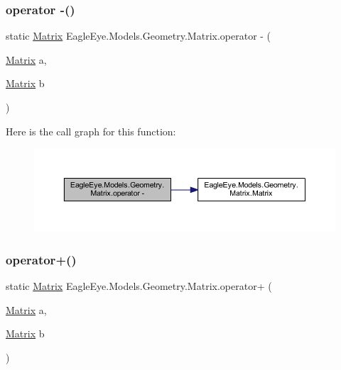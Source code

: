 \subsubsection{\texorpdfstring{operator -\/()}{operator -()}}
{\footnotesize\ttfamily static \mbox{\hyperlink{class_eagle_eye_1_1_models_1_1_geometry_1_1_matrix}{Matrix}} Eagle\+Eye.\+Models.\+Geometry.\+Matrix.\+operator -\/ (\begin{DoxyParamCaption}\item[{\mbox{\hyperlink{class_eagle_eye_1_1_models_1_1_geometry_1_1_matrix}{Matrix}}}]{a,  }\item[{\mbox{\hyperlink{class_eagle_eye_1_1_models_1_1_geometry_1_1_matrix}{Matrix}}}]{b }\end{DoxyParamCaption})\hspace{0.3cm}{\ttfamily [static]}}

Here is the call graph for this function\+:\nopagebreak
\begin{figure}[H]
\begin{center}
\leavevmode
\includegraphics[width=350pt]{class_eagle_eye_1_1_models_1_1_geometry_1_1_matrix_ae4247c2e9fd018350037b01fb64c53cc_cgraph}
\end{center}
\end{figure}
\mbox{\label{class_eagle_eye_1_1_models_1_1_geometry_1_1_matrix_acb6f6c5a5aa600c91c1fac3952be8057}} 
\subsubsection{\texorpdfstring{operator+()}{operator+()}}
{\footnotesize\ttfamily static \mbox{\hyperlink{class_eagle_eye_1_1_models_1_1_geometry_1_1_matrix}{Matrix}} Eagle\+Eye.\+Models.\+Geometry.\+Matrix.\+operator+ (\begin{DoxyParamCaption}\item[{\mbox{\hyperlink{class_eagle_eye_1_1_models_1_1_geometry_1_1_matrix}{Matrix}}}]{a,  }\item[{\mbox{\hyperlink{class_eagle_eye_1_1_models_1_1_geometry_1_1_matrix}{Matrix}}}]{b }\end{DoxyParamCaption})\hspace{0.3cm}{\ttfamily [static]}}

